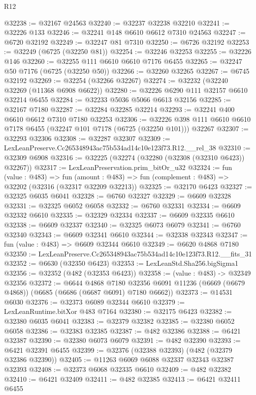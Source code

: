 \begin{lexlean}{R12}
\begin{coremodule}
@32238 := @32167 @24563
@32240 := @32237 @32238 @32210
@32241 := @32226 @133
@32246 := @32241 @148 @6610 @6612 @7310 @24563
@32247 := @6720 @32192
@32249 := @32247 @81 @7310
@32250 := @6726 @32192
@32253 := @32249 (@6725 (@32250 @81))
@32254 := @32246 @32253
@32255 := @32226 @146
@32260 := @32255 @111 @6610 @6610 @7176 @6455
@32265 := @32247 @50 @7176 (@6725 (@32250 @50))
@32266 := @32260 @32265
@32267 := @6745 @32192
@32269 := @32254 (@32266 @32267)
@32274 := @32232 (@32240 @32269 (@11368 @6908 @6622))
@32280 := @32226 @6290 @111 @32157 @6610 @32214 @6455
@32284 := @32233 @5036 @5066 @6613 @32156
@32285 := @32167 @7180
@32287 := @32284 @32285 @32214
@32293 := @32241 @400 @6610 @6612 @7310 @7180 @32253
@32306 := @32226 @398 @111 @6610 @6610 @7178 @6455 (@32247 @101 @7178 (@6725 (@32250 @101))) @32267
@32307 := @32293 @32306
@32308 := @32287 @32307
@32309 := LexLeanPreserve.Cc265348943ac75b534ad14c10e123f73.R12.__rel_38
@32310 := @32309 @6908
@32316 := @32225 (@32274 (@32280 (@32308 (@32310 @6423)) @32267))
@32317 := LexLeanPreservation.prim_bitOr_u32
@32324 := fun (value : @483) =>
  fun (amount : @483) => fun (complement : @483) => @32202 (@32316 (@32317 @32209 @32213))
@32325 := @32170 @6423
@32327 := @32325 @6035 @6041
@32328 := @6760 @32327
@32329 := @6609 @32328
@32331 := @32325 @6052 @6058
@32332 := @6760 @32331
@32334 := @6609 @32332 @6610
@32335 := @32329 @32334
@32337 := @6609 @32335 @6610
@32338 := @6609 @32337
@32340 := @32325 @6073 @6079
@32341 := @6760 @32340
@32343 := @6609 @32341 @6610
@32344 := @32338 @32343
@32347 := fun (value : @483) => @6609 @32344 @6610
@32349 := @6620 @4868 @7180
@32350 := LexLeanPreserve.Cc265348943ac75b534ad14c10e123f73.R12.__fits_31
@32352 := @6630 (@32350 @6423)
@32353 := LexLeanStd.Sha256.bigSigma1
@32356 := @32352 (@482 (@32353 @6423))
@32358 := (value : @483) -> @32349 @32356
@32372 := @6644
    @4868
    @7180
    @32356
    @6091
    @11236
    (@6669 (@6679 @4868))
    (@6685 (@6686 (@6687 @6091) @7180 @6662))
@32373 := @14531 @6030
@32376 := @32373 @6089 @32344 @6610
@32379 := LexLeanRuntime.bitXor @483 @7164
@32380 := @32175 @6423
@32382 := @32380 @6035 @6041
@32383 := @32379 @32382
@32385 := @32380 @6052 @6058
@32386 := @32383 @32385
@32387 := @482 @32386
@32388 := @6421 @32387
@32390 := @32380 @6073 @6079
@32391 := @482 @32390
@32393 := @6421 @32391 @6455
@32399 := @32376 (@32388 @32393) (@482 (@32379 @32386 @32390))
@32405 := @11263 @6069 @6088 @32337 @32343 @32387 @32393
@32408 := @32373 @6068 @32335 @6610
@32409 := @482 @32382
@32410 := @6421 @32409
@32411 := @482 @32385
@32413 := @6421 @32411 @6455

\end{coremodule}
\end{lexlean}
